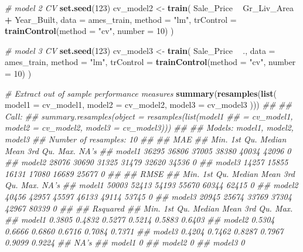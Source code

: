 \documentclass[]{krantz}
\makeatletter
\newenvironment{Shaded}{\begin{snugshade}}{\end{snugshade}}
\newcommand{\CommentTok}[1]{\textcolor[rgb]{0.37,0.37,0.37}{\textit{#1}}}
\newcommand{\DataTypeTok}[1]{\textcolor[rgb]{0.27,0.27,0.27}{#1}}
\newcommand{\DecValTok}[1]{\textcolor[rgb]{0.06,0.06,0.06}{#1}}
\newcommand{\KeywordTok}[1]{\textcolor[rgb]{0.27,0.27,0.27}{\textbf{#1}}}
\newcommand{\NormalTok}[1]{#1}
\newcommand{\OperatorTok}[1]{\textcolor[rgb]{0.43,0.43,0.43}{\textbf{#1}}}
\newcommand{\StringTok}[1]{\textcolor[rgb]{0.5,0.5,0.5}{#1}}
\newenvironment{kframe}{%
\medskip{}
\setlength{\fboxsep}{.8em}
 \def\at@end@of@kframe{}%
 \ifinner\ifhmode%
  \def\at@end@of@kframe{\end{minipage}}%
  \begin{minipage}{\columnwidth}%
 \fi\fi%
 \def\FrameCommand##1{\hskip\@totalleftmargin \hskip-\fboxsep
 \colorbox{shadecolor}{##1}\hskip-\fboxsep
     \hskip-\linewidth \hskip-\@totalleftmargin \hskip\columnwidth}%
 \MakeFramed {\advance\hsize-\width
   \@totalleftmargin\z@ \linewidth\hsize
   \@setminipage}}%
 {\par\unskip\endMakeFramed%
 \at@end@of@kframe}
\renewenvironment{Shaded}{\begin{kframe}}{\end{kframe}}
\makeatother
\begin{document}
\begin{Shaded}
\begin{Highlighting}[]
\CommentTok{# model 2 CV}
\KeywordTok{set.seed}\NormalTok{(}\DecValTok{123}\NormalTok{)}
\NormalTok{cv_model2 <-}\StringTok{ }\KeywordTok{train}\NormalTok{(}
\NormalTok{  Sale_Price }\OperatorTok{~}\StringTok{ }\NormalTok{Gr_Liv_Area }\OperatorTok{+}\StringTok{ }\NormalTok{Year_Built, }
  \DataTypeTok{data =}\NormalTok{ ames_train, }
  \DataTypeTok{method =} \StringTok{"lm"}\NormalTok{,}
  \DataTypeTok{trControl =} \KeywordTok{trainControl}\NormalTok{(}\DataTypeTok{method =} \StringTok{"cv"}\NormalTok{, }\DataTypeTok{number =} \DecValTok{10}\NormalTok{)}
\NormalTok{)}

\CommentTok{# model 3 CV}
\KeywordTok{set.seed}\NormalTok{(}\DecValTok{123}\NormalTok{)}
\NormalTok{cv_model3 <-}\StringTok{ }\KeywordTok{train}\NormalTok{(}
\NormalTok{  Sale_Price }\OperatorTok{~}\StringTok{ }\NormalTok{., }
  \DataTypeTok{data =}\NormalTok{ ames_train, }
  \DataTypeTok{method =} \StringTok{"lm"}\NormalTok{,}
  \DataTypeTok{trControl =} \KeywordTok{trainControl}\NormalTok{(}\DataTypeTok{method =} \StringTok{"cv"}\NormalTok{, }\DataTypeTok{number =} \DecValTok{10}\NormalTok{)}
\NormalTok{)}

\CommentTok{# Extract out of sample performance measures}
\KeywordTok{summary}\NormalTok{(}\KeywordTok{resamples}\NormalTok{(}\KeywordTok{list}\NormalTok{(}
  \DataTypeTok{model1 =}\NormalTok{ cv_model1, }
  \DataTypeTok{model2 =}\NormalTok{ cv_model2, }
  \DataTypeTok{model3 =}\NormalTok{ cv_model3}
\NormalTok{)))}
\CommentTok{## }
\CommentTok{## Call:}
\CommentTok{## summary.resamples(object = resamples(list(model1}
\CommentTok{##  = cv_model1, model2 = cv_model2, model3 = cv_model3)))}
\CommentTok{## }
\CommentTok{## Models: model1, model2, model3 }
\CommentTok{## Number of resamples: 10 }
\CommentTok{## }
\CommentTok{## MAE }
\CommentTok{##         Min. 1st Qu. Median  Mean 3rd Qu.  Max. NA's}
\CommentTok{## model1 36295   36806  37005 38380   40034 42096    0}
\CommentTok{## model2 28076   30690  31325 31479   32620 34536    0}
\CommentTok{## model3 14257   15855  16131 17080   16689 25677    0}
\CommentTok{## }
\CommentTok{## RMSE }
\CommentTok{##         Min. 1st Qu. Median  Mean 3rd Qu.  Max. NA's}
\CommentTok{## model1 50003   52413  54193 55670   60344 62415    0}
\CommentTok{## model2 40456   42957  45597 46133   49114 53745    0}
\CommentTok{## model3 20945   25674  33769 37304   42967 80339    0}
\CommentTok{## }
\CommentTok{## Rsquared }
\CommentTok{##          Min. 1st Qu. Median   Mean 3rd Qu.   Max.}
\CommentTok{## model1 0.3805  0.4832 0.5277 0.5214  0.5883 0.6403}
\CommentTok{## model2 0.5304  0.6666 0.6860 0.6716  0.7084 0.7371}
\CommentTok{## model3 0.4204  0.7462 0.8287 0.7967  0.9099 0.9224}
\CommentTok{##        NA's}
\CommentTok{## model1    0}
\CommentTok{## model2    0}
\CommentTok{## model3    0}
\end{Highlighting}
\end{Shaded}
\end{document}
